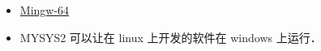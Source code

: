
\begin{itemize}
\item \href{https://en.wikipedia.org/wiki/Mingw-w64}{Mingw-64}
\item MYSYS2 可以让在 linux 上开发的软件在 windows 上运行．
\end{itemize}
